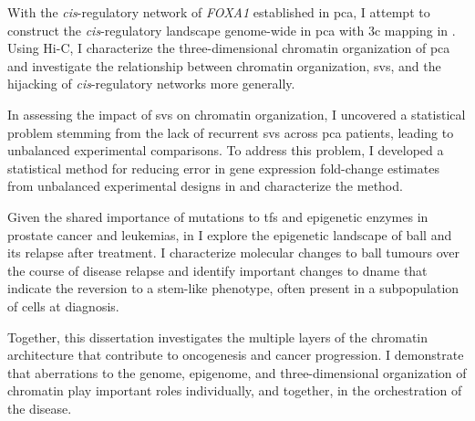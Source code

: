 With the \emph{cis}-regulatory network of \emph{FOXA1} established in \gls{pca}, I attempt to construct the \emph{cis}-regulatory landscape genome-wide in \gls{pca} with \gls{3c} mapping in .
Using Hi-C, I characterize the three-dimensional chromatin organization of \gls{pca} and investigate the relationship between chromatin organization, \glspl{sv}, and the hijacking of \emph{cis}-regulatory networks more generally.

In assessing the impact of \glspl{sv} on chromatin organization, I uncovered a statistical problem stemming from the lack of recurrent \glspl{sv} across \gls{pca} patients, leading to unbalanced experimental comparisons.
To address this problem, I developed a statistical method for reducing error in gene expression fold-change estimates from unbalanced experimental designs in  and characterize the method.

Given the shared importance of mutations to \glspl{tf} and epigenetic enzymes in prostate cancer and leukemias, in  I explore the epigenetic landscape of \gls{ball} and its relapse after treatment.
I characterize molecular changes to \gls{ball} tumours over the course of disease relapse and identify important changes to \gls{dname} that indicate the reversion to a stem-like phenotype, often present in a subpopulation of cells at diagnosis.

Together, this dissertation investigates the multiple layers of the chromatin architecture that contribute to oncogenesis and cancer progression.
I demonstrate that aberrations to the genome, epigenome, and three-dimensional organization of chromatin play important roles individually, and together, in the orchestration of the disease.
